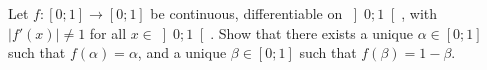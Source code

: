 \begin{problem}
    Let \( f \colon \left[0;1\right] \longrightarrow \left[0;1\right] \) be continuous, differentiable on \( \left]0;1\right[ \), with \( \left|f'\left(x\right)\right| \neq 1 \) for all \( x \in \left]0;1\right[ \). Show that there exists a unique \( \alpha \in \left[0;1\right] \) such that \( f\left(\alpha\right) = \alpha \), and a unique \( \beta \in \left[0;1\right] \) such that \( f\left(\beta\right) = 1-\beta \).
\end{problem}

